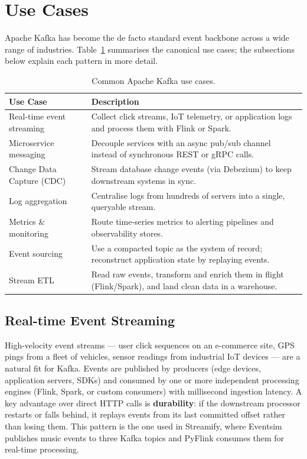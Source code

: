 \section{Use Cases}

Apache Kafka has become the de facto standard event backbone across a wide range of industries.
Table~\ref{tab:kafka-usecases} summarises the canonical use cases; the subsections below explain
each pattern in more detail.

\begin{table}[H]
  \centering
  \caption{Common Apache Kafka use cases.}
  \label{tab:kafka-usecases}
  \begin{tabularx}{\textwidth}{lX}
    \toprule
    \textbf{Use Case}              & \textbf{Description} \\
    \midrule
    Real-time event streaming      & Collect click streams, IoT telemetry, or application logs and process them with Flink or Spark. \\
    Microservice messaging         & Decouple services with an async pub/sub channel instead of synchronous REST or gRPC calls. \\
    Change Data Capture (CDC)      & Stream database change events (via Debezium) to keep downstream systems in sync. \\
    Log aggregation                & Centralise logs from hundreds of servers into a single, queryable stream. \\
    Metrics \& monitoring          & Route time-series metrics to alerting pipelines and observability stores. \\
    Event sourcing                 & Use a compacted topic as the system of record; reconstruct application state by replaying events. \\
    Stream ETL                     & Read raw events, transform and enrich them in flight (Flink/Spark), and land clean data in a warehouse. \\
    \bottomrule
  \end{tabularx}
\end{table}

\subsection{Real-time Event Streaming}

High-velocity event streams — user click sequences on an e-commerce site, GPS pings from a
fleet of vehicles, sensor readings from industrial IoT devices — are a natural fit for Kafka.
Events are published by producers (edge devices, application servers, SDKs) and consumed by one
or more independent processing engines (Flink, Spark, or custom consumers) with millisecond ingestion latency.
A key advantage over direct HTTP calls is \textbf{durability}: if the downstream processor
restarts or falls behind, it replays events from its last committed offset rather than losing them.
This pattern is the one used in Streamify, where Eventsim publishes music events to three Kafka
topics and PyFlink consumes them for real-time processing.

